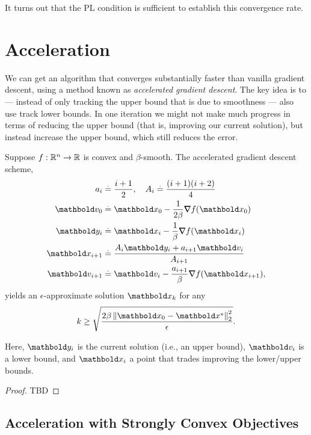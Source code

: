 \begin{rmk}
It turns out that the PL condition is sufficient to establish this convergence rate.
\end{rmk}

\section{Acceleration}

We can get an algorithm that converges substantially faster than vanilla gradient descent, using a method known as \emph{accelerated gradient descent}. The key idea is to --- instead of only tracking the upper bound that is due to smoothness --- also use track lower bounds. In one iteration we might not make much progress in terms of reducing the upper bound (that is, improving our current solution), but instead increase the upper bound, which still reduces the error.

\begin{thm} Suppose $f: \mathbb{R}^n \to \mathbb{R}$ is convex and $\beta$-smooth. The accelerated gradient descent scheme, \begin{align}\begin{split}
    a_i &\defeq \frac{i+1}{2}, \quad A_i \defeq \frac{(i+1)(i+2)}{4} \\
    \vv_0 &\defeq \vx_0 - \frac{1}{2\beta} \grad f(\vx_0) \\
    \vy_i &\defeq \vx_i - \frac{1}{\beta} \grad f(\vx_i) \\
    \vx_{i+1} &\defeq \frac{A_i\vy_i + a_{i+1}\vv_i}{A_{i+1}} \\
    \vv_{i+1} &\defeq \vv_i - \frac{a_{i+1}}{\beta} \grad f(\vx_{i+1}),
\end{split}\end{align} yields an $\epsilon$-approximate solution $\vx_k$ for any \begin{align*}
    k \geq \sqrt{\frac{2\beta\norm{\vx_0 - \s{\vx}}_2^2}{\epsilon}}.
\end{align*}
\end{thm} Here, $\vy_i$ is the current solution (i.e., an upper bound), $\vv_i$ is a lower bound, and $\vx_i$ a point that trades improving the lower/upper bounds.

\begin{proof}
TBD
\end{proof}

\subsection{Acceleration with Strongly Convex Objectives}

